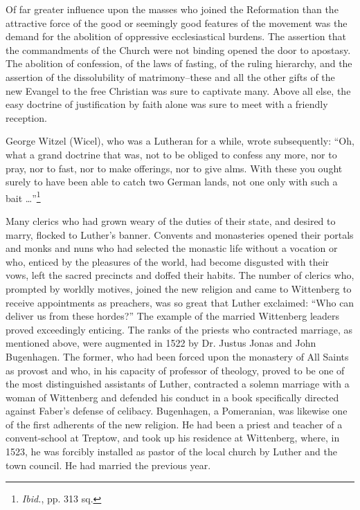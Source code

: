 Of far greater influence upon the masses who joined the Reformation
than the attractive force of the good or seemingly good
features of the movement was the demand for the abolition of oppressive
ecclesiastical burdens. The assertion that the commandments
of the Church were not binding opened the door to apostasy. The
abolition of confession, of the laws of fasting, of the ruling hierarchy,
and the assertion of the dissolubility of matrimony--these and all the
other gifts of the new Evangel to the free Christian was sure to captivate
many. Above all else, the easy doctrine of justification by faith
alone was sure  to meet with a friendly reception.

George Witzel (Wicel), who was a Lutheran for a while, wrote
subsequently: “Oh, what a grand doctrine that was, not to be obliged
to confess any more, nor to pray, nor to fast, nor to make offerings,
nor to give alms. With these you ought surely to have been able to
catch two German lands, not one only with such a bait \dots”\footnote
{\textit{Ibid.}, pp. 313 sq.}

Many clerics who had grown weary of the duties of their state, and
desired to marry, flocked to Luther’s banner. Convents and monasteries
opened their portals and monks and nuns who had selected the
monastic life without a vocation or who, enticed by the pleasures of
the world, had become disgusted with their vows, left the sacred
precincts and doffed their habits. The number of clerics who,
prompted by worldly motives, joined the new religion and came to
Wittenberg to receive appointments as preachers, was so great that
Luther exclaimed: “Who can deliver us from these hordes?” The example
of the married Wittenberg leaders proved exceedingly enticing.
The ranks of the priests who contracted marriage, as mentioned
above, were augmented in 1522 by Dr. Justus Jonas and John Bugenhagen.
The former, who had been forced upon the monastery of All
Saints as provost and who, in his capacity of professor of theology,
proved to be one of the most distinguished assistants of Luther, contracted
a solemn marriage with a woman of Wittenberg and defended his conduct in
a book specifically directed against Faber’s defense
of celibacy. Bugenhagen, a Pomeranian, was likewise one of
the first adherents of the new religion. He had been a priest and
teacher of a convent-school at Treptow, and took up his residence
at Wittenberg, where, in 1523, he was forcibly installed as pastor of
the local church by Luther and the town council. He had married
the previous year.

